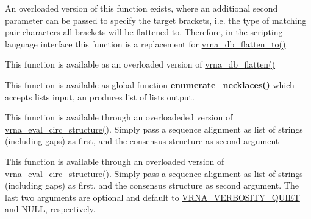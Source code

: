 \begin{DoxyRefList}
An overloaded version of this function exists, where an additional second parameter can be passed to specify the target brackets, i.\+e. the type of matching pair characters all brackets will be flattened to. Therefore, in the scripting language interface this function is a replacement for \mbox{\hyperlink{group__struct__utils_ga690425199c8b71545e7196e3af1436f8}{vrna\+\_\+db\+\_\+flatten\+\_\+to()}}.  
\item[\label{wrappers__wrappers000089}%
\Hypertarget{wrappers__wrappers000089}%
Global \mbox{\hyperlink{group__struct__utils_ga690425199c8b71545e7196e3af1436f8}{vrna\+\_\+db\+\_\+flatten\+\_\+to}} (char $\ast$string, const char target\mbox{[}3\mbox{]}, unsigned int options)]This function is available as an overloaded version of \mbox{\hyperlink{group__struct__utils_gae966b9f44168a4f4b39ca42ffb5f37b7}{vrna\+\_\+db\+\_\+flatten()}}  
\item[\label{wrappers__wrappers000003}%
\Hypertarget{wrappers__wrappers000003}%
Global \mbox{\hyperlink{group__utils_gae081ac655a76bd5c4b3d86c60b096b75}{vrna\+\_\+enumerate\+\_\+necklaces}} (const unsigned int $\ast$type\+\_\+counts)]This function is available as global function {\bfseries enumerate\+\_\+necklaces()} which accepts lists input, an produces list of lists output.  
\item[\label{wrappers__wrappers000040}%
\Hypertarget{wrappers__wrappers000040}%
Global \mbox{\hyperlink{group__eval_gac96577cf232c71160f762737a994b7c6}{vrna\+\_\+eval\+\_\+circ\+\_\+consensus\+\_\+structure}} (const char $\ast$$\ast$alignment, const char $\ast$structure)]This function is available through an overloadeded version of \mbox{\hyperlink{group__eval_ga3e05a23ddf9b083f4e69881e440d4866}{vrna\+\_\+eval\+\_\+circ\+\_\+structure()}}. Simply pass a sequence alignment as list of strings (including gaps) as first, and the consensus structure as second argument  
\item[\label{wrappers__wrappers000050}%
\Hypertarget{wrappers__wrappers000050}%
Global \mbox{\hyperlink{group__eval_gae89240c230e4740b22a703ee953396b9}{vrna\+\_\+eval\+\_\+circ\+\_\+consensus\+\_\+structure\+\_\+v}} (const char $\ast$$\ast$alignment, const char $\ast$structure, int verbosity\+\_\+level, F\+I\+LE $\ast$file)]This function is available through an overloaded version of \mbox{\hyperlink{group__eval_ga3e05a23ddf9b083f4e69881e440d4866}{vrna\+\_\+eval\+\_\+circ\+\_\+structure()}}. Simply pass a sequence alignment as list of strings (including gaps) as first, and the consensus structure as second argument. The last two arguments are optional and default to \mbox{\hyperlink{eval_8h_af4afe19780b61b4962c613bde324128b}{V\+R\+N\+A\+\_\+\+V\+E\+R\+B\+O\+S\+I\+T\+Y\+\_\+\+Q\+U\+I\+ET}} and N\+U\+LL, respectively.  

\end{DoxyRefList}
